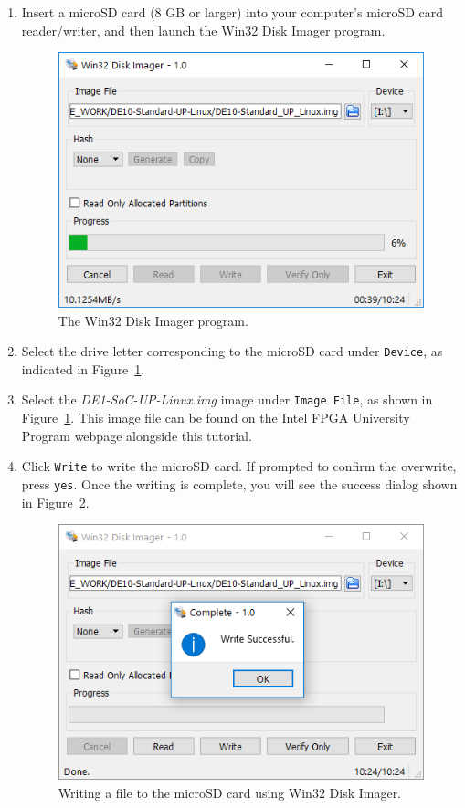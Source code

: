 \documentclass[11pt, twoside, pdftex]{article}
\begin{document}
\begin{enumerate}
\item Insert a microSD card (8 GB or larger) into your computer's microSD card reader/writer,
and then launch the Win32 Disk Imager program.
\begin{figure} [h]
\begin{center}
\includegraphics[scale = 0.7]{figures/Win32DiskImager1.png}
\end{center}
\caption{The Win32 Disk Imager program.}
\label{fig:win32_disk_imager}
\end{figure}
\item Select the drive letter corresponding to the microSD card under \texttt{Device}, as indicated 
in Figure~\ref{fig:win32_disk_imager}.
\item Select the \textit{DE1-SoC-UP-Linux.img} image under \texttt{Image File}, as shown in 
Figure~\ref{fig:win32_disk_imager}. This image file can be found on the Intel FPGA University 
Program webpage alongside this tutorial.
\item Click \texttt{Write} to write the microSD card. If prompted to confirm the overwrite, 
press \texttt{yes}. Once the writing is complete, you will see the success dialog shown in 
Figure~\ref{fig:win32_disk_imager_4}.
\begin{figure} [h]
\begin{center}
\includegraphics[scale = 0.7]{figures/Win32DiskImager4.png}
\end{center}
\caption{Writing a file to the microSD card using Win32 Disk Imager.}
\label{fig:win32_disk_imager_4}
\end{figure}


\end{enumerate}
\end{document}
